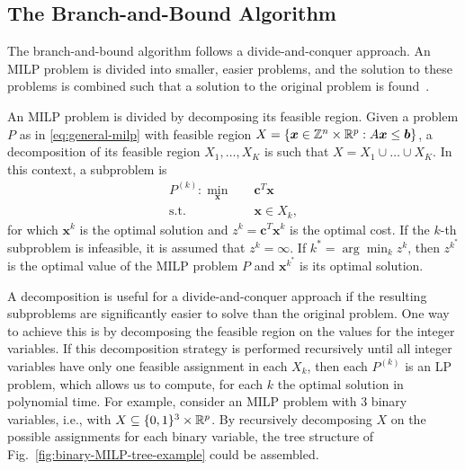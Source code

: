 \subsection{The Branch-and-Bound Algorithm}

The branch-and-bound algorithm follows a divide-and-conquer approach.
An MILP problem is divided into smaller, easier problems, and the solution to these problems is combined such that a solution to the original problem is found~\cite{wolseyIntegerProgramming1998}.

An MILP problem is divided by decomposing its feasible region.
Given a problem $P$ as in \eqref{eq:general-milp} with feasible region $X=\{\bm{x}\in \mathbb{Z}^{n}\times \mathbb{R}^{p}: A\bm{x}\le \bm{b}\}$, a decomposition of its feasible region $X_1,\ldots,X_K$ is such that $X=X_1\cup \ldots\cup X_K$.
In this context, a subproblem is
\begin{equation}\label{eq:milp-subproblem}
\begin{split}
    P^{(k)} : \min_{\bm{x}} \quad & \bm{c}^{T}\bm{x} \\
    \textrm{s.t.} \quad & \bm{x}\in X_k
,\end{split}
\end{equation}
for which $\bm{x}^{k}$ is the optimal solution and $z^{k}=\bm{c}^{T}\bm{x}^{k}$ is the optimal cost.
If the $k$-th subproblem is infeasible, it is assumed that $z^{k}=\infty$.
If $k^{*}= \arg\min_k z^{k}$, then $z^{k^*}$ is the optimal value of the MILP problem $P$ and $\bm{x}^{k^*}$ is its optimal solution.

A decomposition is useful for a divide-and-conquer approach if the resulting subproblems are significantly easier to solve than the original problem.
One way to achieve this is by decomposing the feasible region on the values for the integer variables.
If this decomposition strategy is performed recursively until all integer variables have only one feasible assignment in each $X_k$, then each $P^{(k)}$ is an LP problem, which allows us to compute, for each $k$ the optimal solution in polynomial time.
For example, consider an MILP problem with 3 binary variables, i.e., with $X\subseteq \{0,1\}^{3}\times \mathbb{R}^{p}$.
By recursively decomposing $X$ on the possible assignments for each binary variable, the tree structure of Fig.~\ref{fig:binary-MILP-tree-example} could be assembled.

